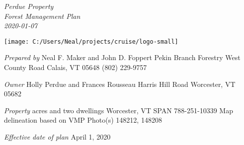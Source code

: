 \documentclass[]{tufte-handout}
\date{}
\begin{document}
\thispagestyle{empty}

\LARGE \emph{Perdue Property}\\
\Large \emph{Forest Management Plan}\\
\Large \emph{2020-01-07}

\begin{marginfigure}

{\centering \texttt{[image: C:/Users/Neal/projects/cruise/logo-small]} 

}

\end{marginfigure}

\normalsize 

\begin{marginfigure}
\noindent \textit{\large Prepared by} 
\newline\indent Neal F. Maker and John D. Foppert  
\newline\indent Pekin Branch Forestry  
\newline{} West County Road  
\newline\indent Calais, VT 05648  
\newline\indent (802) 229-9757  
\end{marginfigure}

\begin{marginfigure}
\noindent \textit{\large Owner}
\newline\indent Holly Perdue and Frances Rousseau  
\newline{} Harris Hill Road
\indent 
\newline\indent Worcester, VT 05682  
\end{marginfigure}

\begin{marginfigure}
\noindent \textit{\large Property}   
\newline{} acres and two dwellings   
\newline\indent Worcester, VT  
\newline\indent SPAN 788-251-10339  
\newline\indent Map delineation based on VMP  
\newline\indent Photo(s) 148212, 148208  
\end{marginfigure}

\begin{marginfigure}
\noindent \textit{\large Effective date of plan}  
\newline\indent April 1, 2020  
\end{marginfigure}
\end{document}

